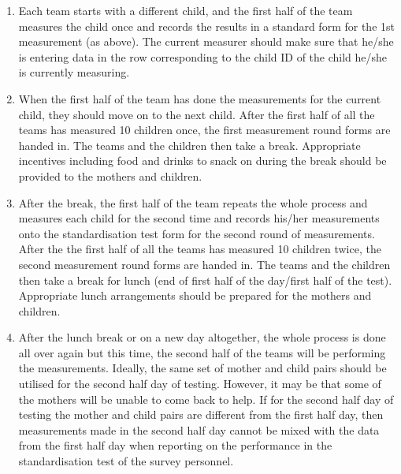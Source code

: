 \documentclass[12pt,a4paper]{book}
\theoremstyle{definition}
\theoremstyle{definition}
\theoremstyle{definition}
\theoremstyle{remark}
\begin{document}
\begin{enumerate}
\def\labelenumi{\arabic{enumi}.}
\setcounter{enumi}{1}
\item
  Each team starts with a different child, and the first half of the
  team measures the child once and records the results in a standard
  form for the 1st measurement (as above). The current measurer should
  make sure that he/she is entering data in the row corresponding to the
  child ID of the child he/she is currently measuring.
\item
  When the first half of the team has done the measurements for the
  current child, they should move on to the next child. After the first
  half of all the teams has measured 10 children once, the first
  measurement round forms are handed in. The teams and the children then
  take a break. Appropriate incentives including food and drinks to
  snack on during the break should be provided to the mothers and
  children.
\item
  After the break, the first half of the team repeats the whole process
  and measures each child for the second time and records his/her
  measurements onto the standardisation test form for the second round
  of measurements. After the the first half of all the teams has
  measured 10 children twice, the second measurement round forms are
  handed in. The teams and the children then take a break for lunch (end
  of first half of the day/first half of the test). Appropriate lunch
  arrangements should be prepared for the mothers and children.
\item
  After the lunch break or on a new day altogether, the whole process is
  done all over again but this time, the second half of the teams will
  be performing the measurements. Ideally, the same set of mother and
  child pairs should be utilised for the second half day of testing.
  However, it may be that some of the mothers will be unable to come
  back to help. If for the second half day of testing the mother and
  child pairs are different from the first half day, then measurements
  made in the second half day cannot be mixed with the data from the
  first half day when reporting on the performance in the
  standardisation test of the survey personnel.
\end{enumerate}


\end{document}
